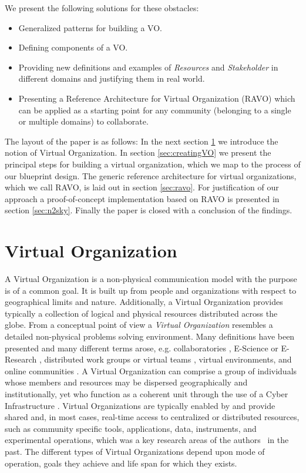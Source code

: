 \documentclass[]{article}
\begin{document}
We present the following solutions for these obstacles:
\begin{itemize}
\item	Generalized patterns for building a VO.
\item	Defining components of a VO.
\item	Providing new definitions and examples of \emph{Resources} and \emph{Stakeholder} in different domains and justifying them in real world.
\item	Presenting a Reference Architecture for Virtual Organization (RAVO) which can be applied as a starting point for any community (belonging to a single or multiple domains) to collaborate.
\end{itemize}

The layout of the paper is as follows: In the next section \ref{sec:VO} we introduce the notion of Virtual Organization. In section \ref{sec:creatingVO} we present the principal steps for building a virtual organization, which we map to the process of our blueprint design. The generic reference architecture for virtual organizations, which we call RAVO, is laid out in section \ref{sec:ravo}.
For justification of our approach a proof-of-concept implementation based on RAVO is presented in section \ref{sec:n2sky}. Finally the paper is closed with a conclusion of the findings.

\section{Virtual Organization}
\label{sec:VO}
A Virtual Organization is a non-physical communication model with the purpose is of a common goal. It is built up from people and organizations with respect to geographical limits and nature.
Additionally, a Virtual Organization provides typically a collection of logical and physical resources distributed across the globe. From a conceptual point of view a \emph{Virtual Organization} resembles a detailed non-physical problems solving environment. Many definitions have been presented and many different terms arose, e.g. collaboratories \cite{Kesselman2008,WAWulf1993}, E-Science or E-Research \cite{Kesselman2008,Hey2005}, distributed work groups or virtual teams \cite{Kesselman2008,OLeary2007}, virtual environments, and online communities \cite{Kesselman2008,Preece2000}.
A Virtual Organization can comprise a group of individuals whose members and resources may be dispersed geographically and institutionally, yet who function as a coherent unit through the use of a Cyber Infrastructure \cite{Kesselman2008}. Virtual Organizations are typically enabled by and provide shared and, in most cases, real-time access to centralized or distributed resources, such as community specific tools, applications, data, instruments, and experimental operations, which was a key research areas of the authors~\cite{schikuta_vipios_2002,schikuta_vipios:_1998,brezany_software_1996} in the past. The different types of Virtual Organizations depend upon mode of operation, goals they achieve and life span for which they exists.
\end{document}
